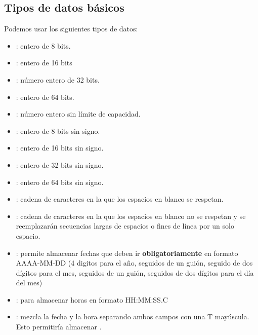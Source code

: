 \documentclass[letterpaper,10pt,spanish]{sphinxmanual}
\begin{document}
\subsection{Tipos de datos básicos}
\label{tema5:tipos-de-datos-basicos}
Podemos usar los siguientes tipos de datos:
\begin{itemize}
\item {} 
: entero de 8 bits.

\item {} 
: entero de 16 bits

\item {} 
: número entero de 32 bits.

\item {} 
: entero de 64 bits.

\item {} 
: número entero sin límite de capacidad.

\item {} 
: entero de 8 bits sin signo.

\item {} 
: entero de 16 bits sin signo.

\item {} 
: entero de 32 bits sin signo.

\item {} 
: entero de 64 bits sin signo.

\item {} 
: cadena de caracteres en la que los espacios en blanco se respetan.

\item {} 
: cadena de caracteres en la que los espacios en blanco no se respetan y se reemplazarán secuencias largas de espacios o fines de línea por un solo espacio.

\item {} 
: permite almacenar fechas que deben ir \textbf{obligatoriamente} en formato AAAA-MM-DD (4 digitos para el año, seguidos de un guión, seguido de dos dígitos para el mes, seguidos de un guión, seguidos de dos dígitos para el día del mes)

\item {} 
: para almacenar horas en formato HH:MM:SS.C

\item {} 
: mezcla la fecha y la hora separando ambos campos con una T mayúscula. Esto permitiría almacenar .


\end{itemize}
\end{document}
